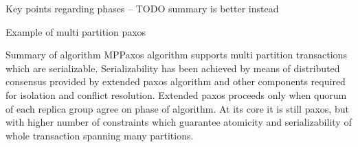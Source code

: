 Key points regarding phases -- TODO summary is better instead


Example of multi partition paxos




Summary of algorithm
MPPaxos algorithm supports multi partition transactions which are serializable. Serializability has been achieved by means of distributed consensus provided by extended paxos algorithm and other components required for isolation and conflict resolution. Extended paxos proceeds only when quorum of each replica group agree on phase of algorithm. At its core it is still paxos, but with higher number of constraints which guarantee atomicity and serializability of whole transaction spanning many partitions.




